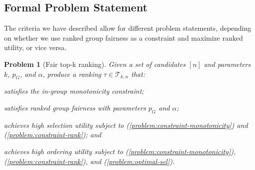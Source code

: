 \subsection{Formal Problem Statement}
\label{subsec:problem-statement}
The criteria we have described allow for different problem statements, depending on whether we use ranked group fairness as a constraint and maximize ranked utility, or vice versa.

\newtheorem*{problem*}{Problem}
\begin{problem*}[Fair top-k ranking]
	Given a set of candidates $[n]$ and parameters $k$, $p_G$, and $\alpha$, produce a ranking $\tau \in {\mathcal T}_{k,n}$ that:
	\begin{compactenum}[(i)]
		\item \label{problem:constraint-monotonicity} satisfies the in-group monotonicity constraint;
		\item \label{problem:constraint-rank} satisfies ranked group fairness with parameters $p_G$ and $\alpha$;
		\item \label{problem:optimal-sel} achieves high selection utility subject to (\ref{problem:constraint-monotonicity}) and (\ref{problem:constraint-rank}); and
		\item \label{problem:maximum-ord} achieves high ordering utility subject to (\ref{problem:constraint-monotonicity}), (\ref{problem:constraint-rank}), and (\ref{problem:optimal-sel}).
	\end{compactenum}
\end{problem*}

